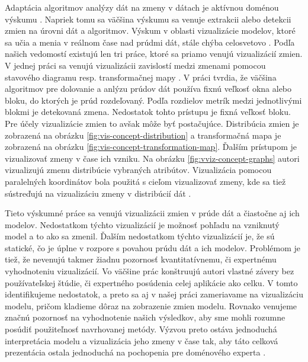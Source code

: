 Adaptácia algoritmov analýzy dát na zmeny v dátach je aktívnou doménou výskumu \citep{Yao2013, pratt2003visualizing}. Napriek tomu sa väčšina výskumu sa venuje extrakcii alebo detekcii zmien na úrovni dát a algoritmov. Výskum v oblasti vizualizácie modelov, ktoré sa učia a menia v reálnom čase nad prúdmi dát, stále chýba celosvetovo \citep{Yao2013}. Podľa našich vedomostí existujú len tri práce, ktoré sa priamo venujú vizualizácií zmien. V jednej práci sa venujú vizualizácii zavislostí medzi zmenami pomocou stavového diagramu resp. transformačnej mapy \citep{Yao2013}. V práci tvrdia, že väčšina algoritmov pre dolovanie a anlýzu prúdov dát používa fixnú veľkosť okna alebo bloku, do ktorých je prúd rozdeľovaný. Podľa rozdielov metrík medzi jednotlivými blokmi je detekovaná zmena. Nedostatok tohto prístupu je fixná veľkosť bloku. Pre účely vizualizácie zmien to avšak môže byť postačujúce. Distribúcia zmien je zobrazená na obrázku \ref{fig:vis-concept-distribution} a transformačná mapa je zobrazená na obrázku \ref{fig:vis-concept-transformation-map}. Ďalším prístupom je vizualizovať zmeny v čase ich vzniku. Na obrázku \ref{fig:vviz-concept-graphs} autori vizualizujú zmenu distribúcie vybraných atribútov. Vizualizácia pomocou paralelných koordinátov bola použitá s cieľom vizualizovať zmeny, kde sa tiež sústreďujú na vizualizáciu zmeny v distribúcií dát \citep{pratt2003visualizing}.
\label{fig:vis-concept-distribution}

\label{fig:vis-concept-transformation-map}

\label{fig:vviz-concept-graphs}

Tieto výskumné práce sa venujú vizualizácii zmien v prúde dát a čiastočne aj ich modelov. Nedostatkom týchto vizualizácií je možnosť pohľadu na vzniknutý model a to ako sa zmenil. Ďalším nedostatkom týchto vizualizácií je, že sú statické, čo je úplne v rozpore s povahou prúdu dát a ich modelov. Problémom je tiež, že nevenujú takmer žiadnu pozornosť kvantitatívnemu, či expertnému vyhodnoteniu vizualizácií. Vo väčšine prác konštruujú autori vlastné závery bez používateľskej štúdie, či expertného posúdenia celej aplikácie ako celku. V tomto identifikujeme nedostatok, a preto sa aj v našej práci zameriavame na vizualizáciu modelu, pričom kladieme dôraz na zobrazenie zmien modelu. Rovnako venujeme značnú pozornosť na vyhodnotenie našich výsledkov, aby sme mohli rozumne posúdiť použiteľnosť navrhovanej metódy. Výzvou preto ostáva jednoduchá interpretácia modelu a vizualizácia jeho zmeny v čase tak, aby táto celková prezentácia ostala jednoduchá na pochopenia pre doménového experta \citep{Demsar2014, Yao2013}. 







